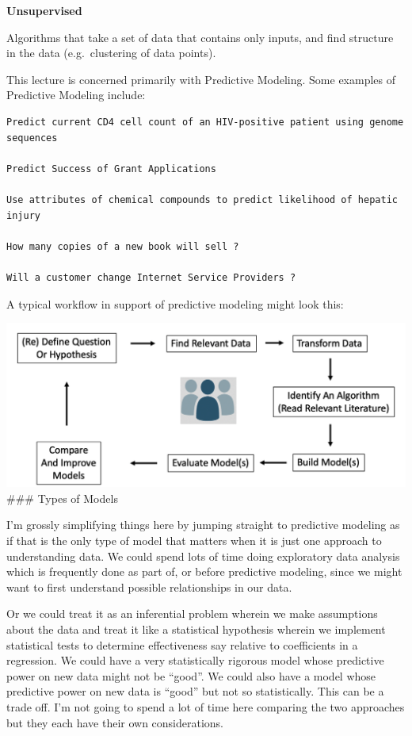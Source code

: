 \documentclass[
]{article}
\begin{document}
\textbf{Unsupervised}

Algorithms that take a set of data that contains only inputs, and find
structure in the data (e.g.~clustering of data points).

This lecture is concerned primarily with Predictive Modeling. Some
examples of Predictive Modeling include:

\begin{verbatim}
Predict current CD4 cell count of an HIV-positive patient using genome sequences

Predict Success of Grant Applications

Use attributes of chemical compounds to predict likelihood of hepatic injury

How many copies of a new book will sell ?

Will a customer change Internet Service Providers ?
\end{verbatim}

A typical workflow in support of predictive modeling might look this:

\includegraphics{./IMG/worfflow.png} \#\#\# Types of Models

I'm grossly simplifying things here by jumping straight to predictive
modeling as if that is the only type of model that matters when it is
just one approach to understanding data. We could spend lots of time
doing exploratory data analysis which is frequently done as part of, or
before predictive modeling, since we might want to first understand
possible relationships in our data.

Or we could treat it as an inferential problem wherein we make
assumptions about the data and treat it like a statistical hypothesis
wherein we implement statistical tests to determine effectiveness say
relative to coefficients in a regression. We could have a very
statistically rigorous model whose predictive power on new data might
not be ``good''. We could also have a model whose predictive power on
new data is ``good'' but not so statistically. This can be a trade off.
I'm not going to spend a lot of time here comparing the two approaches
but they each have their own considerations.
\end{document}

